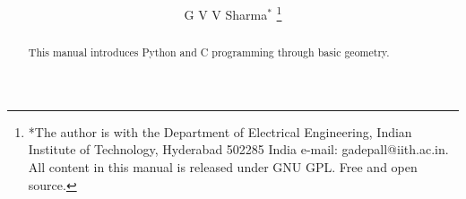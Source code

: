 \documentclass[journal,12pt,twocolumn]{IEEEtran}
\renewcommand\thesection{\arabic{section}}
\begin{document}
\let\StandardTheFigure\thefigure
\renewcommand{\thefigure}{\thesection}



\makeatletter
{}
\makeatother

\let\StandardTheFigure\thefigure
\let\StandardTheTable\thetable
\let\vec\mathbf





\def\putbox#1#2#3{\makebox[0in][l]{\makebox[#1][l]{}\raisebox{\baselineskip}[0in][0in]{\raisebox{#2}[0in][0in]{#3}}}}
     \def\rightbox#1{\makebox[0in][r]{#1}}
     \def\centbox#1{\makebox[0in]{#1}}
     \def\topbox#1{\raisebox{-\baselineskip}[0in][0in]{#1}}
     \def\midbox#1{\raisebox{-0.5\baselineskip}[0in][0in]{#1}}

\vspace{3cm}

\title{ 
}

\author{ G V V Sharma$^{*}$%
	\thanks{*The author is with the Department
		of Electrical Engineering, Indian Institute of Technology, Hyderabad
		502285 India e-mail:  gadepall@iith.ac.in. All content in this manual is released under GNU GPL.  Free and open source.}
	
}	

\maketitle

\tableofcontents

\bigskip

\renewcommand{\thefigure}{\theenumi}
\renewcommand{\thetable}{\theenumi}

\begin{abstract}
This manual introduces Python and C programming through basic geometry.
\end{abstract}
\end{document}
